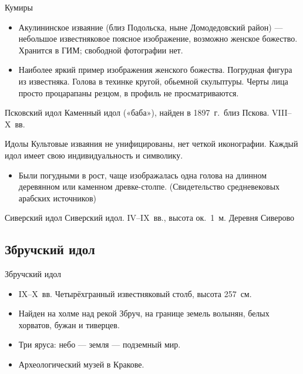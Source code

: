 \begin{frame}{Кумиры}
  \begin{itemize}
    \item Акулининское изваяние (близ Подольска, ныне Домодедовский район)
          --- небольшое известняковое поясное изображение,
          возможно женское божество. Хранится в ГИМ;
          свободной фотографии нет.
    \item Наиболее яркий пример изображения женского божества. Погрудная фигура из известняка. Голова в техинке кругой, обьемной скульптуры. Черты лица просто процарапаны резцом, в профиль не просматриваются.
  \end{itemize}
\end{frame}

\begin{frame}{Псковский идол}
    {Каменный идол («баба»), найден в 1897~г.\ близ Пскова.
     VIII--X~вв.}
\end{frame}

\begin{frame}{Идолы}
  Культовые изваяния не унифицированы, нет четкой иконографии. Каждый идол имеет свою индивидуальность и символику.
  \begin{itemize}
    \item Были погудными в рост, чаще изображалась одна голова на длинном деревянном или каменном древке-столпе. (Свидетельство средневековых арабских источников)
  \end{itemize}
\end{frame}

\begin{frame}{Сиверский идол}
    {Сиверский идол. IV--IX~вв., высота ок.\ 1~м.
     Деревня Сиверово}
\end{frame}

\subsection{Збручский идол}

\begin{frame}{Збручский идол}
  \begin{itemize}
    \item IX--X~вв. Четырёхгранный известняковый столб, высота 257~см.
    \item Найден на холме над рекой Збруч,
          на границе земель волынян, белых хорватов, бужан и тиверцев.
    \item Три яруса: небо --- земля --- подземный мир.
    \item Археологический музей в Кракове.
  \end{itemize}
\end{frame}

